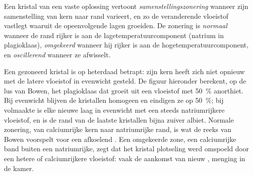 \begin{definition}[Samenstellingszonering]\label{def:b2:magmatic-differentiation:zoning}
Een kristal van een vaste oplossing vertoont \emph{samenstellingszonering}
wanneer zijn samenstelling van kern naar rand varieert, en zo de veranderende vloeistof vastlegt
waaruit de opeenvolgende lagen groeiden. De zonering is \emph{normaal} wanneer de rand rijker is aan
de lagetemperatuurcomponent (natrium in plagioklaas), \emph{omgekeerd} wanneer hij
rijker is aan de hogetemperatuurcomponent, en \emph{oscillerend} wanneer ze afwisselt.
\end{definition}

Een gezoneerd kristal is  op heterdaad betrapt: zijn kern heeft zich
niet opnieuw met de latere vloeistof in evenwicht gesteld. De figuur hieronder berekent, op de lus van Bowen,
het plagioklaas dat groeit uit een vloeistof met \qty{50}{\percent} anorthiet. Bij
evenwicht blijven de kristallen homogeen en eindigen ze op \qty{50}{\percent}; bij volmaakte
 is elke nieuwe laag in evenwicht met een steeds natriumrijkere
vloeistof, en is de rand van de laatste kristallen bijna zuiver albiet. Normale zonering, van
calciumrijke kern naar natriumrijke rand, is wat de reeks van Bowen voorspelt voor een afkoelend . Een omgekeerde
zone, een calciumrijke band buiten een natriumrijke, zegt dat het kristal plotseling werd omspoeld door
een hetere of calciumrijkere vloeistof: vaak de aankomst van nieuw , menging in de
kamer.

